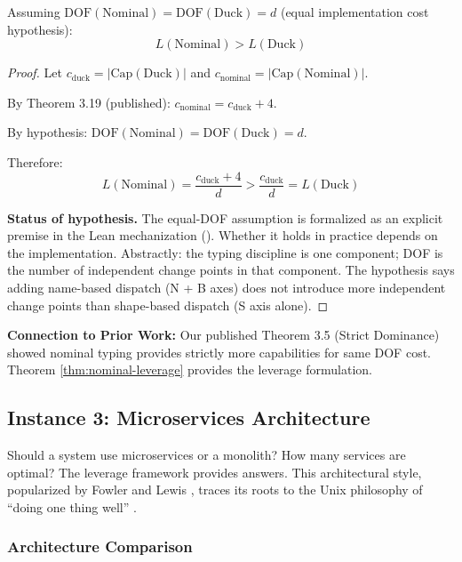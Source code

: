 \begin{theorem}\label{thm:nominal-leverage}
Assuming $\mathrm{DOF}(\mathrm{Nominal}) = \mathrm{DOF}(\mathrm{Duck}) = d$ (equal implementation cost hypothesis):
\[
L(\text{Nominal}) > L(\text{Duck})
\]
\end{theorem}

\begin{proof}
Let $c_{\text{duck}} = |\text{Cap}(\text{Duck})|$ and $c_{\text{nominal}} = |\text{Cap}(\text{Nominal})|$.

By Theorem 3.19 (published): $c_{\text{nominal}} = c_{\text{duck}} + 4$.

By hypothesis: $\text{DOF}(\text{Nominal}) = \text{DOF}(\text{Duck}) = d$.

Therefore:
\[
L(\text{Nominal}) = \frac{c_{\text{duck}} + 4}{d} > \frac{c_{\text{duck}}}{d} = L(\text{Duck})
\]

\textbf{Status of hypothesis.} The equal-DOF assumption is formalized as an explicit premise in the Lean mechanization (). Whether it holds in practice depends on the implementation. Abstractly: the typing discipline is one component; DOF is the number of independent change points in that component. The hypothesis says adding name-based dispatch (N + B axes) does not introduce more independent change points than shape-based dispatch (S axis alone).
\end{proof}

\textbf{Connection to Prior Work:} Our published Theorem 3.5 (Strict Dominance) showed nominal typing provides strictly more capabilities for same DOF cost. Theorem \ref{thm:nominal-leverage} provides the leverage formulation.

\subsection{Instance 3: Microservices Architecture}

Should a system use microservices or a monolith? How many services are optimal? The leverage framework provides answers. This architectural style, popularized by Fowler and Lewis \cite{fowler2014microservices}, traces its roots to the Unix philosophy of ``doing one thing well'' \cite{pike1984program}.

\subsubsection{Architecture Comparison}

